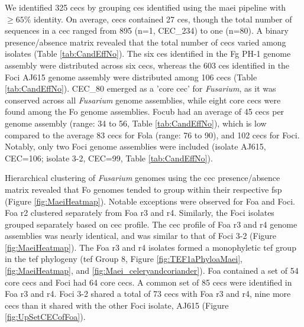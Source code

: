 We identified 325 \acfp{cec} by grouping \acp{ce} identified using the \ac{maei} pipeline with $\ge65\%$ identity. On average, \acp{cec} contained 27 \acp{ce}, though the total number of sequences in a \ac{cec} ranged from 895 (n=1, CEC\_234) to one (n=80). A binary presence/absence matrix revealed that the total number of \acp{cec} varied among isolates (Table \ref{tab:CandEffNo}). The six \acp{ce} identified in the \ac{Fg} PH-1 genome assembly were distributed across six \acp{cec}, whereas the 603 \acp{ce} identified in the \ac{Foci} AJ615 genome assembly were distributed among 106 \acp{cec} (Table \ref{tab:CandEffNo}). CEC\_80 emerged as a 'core \ac{cec}' for \textit{Fusarium}, as it was conserved across all \textit{Fusarium} genome assemblies, while eight core \acp{cec} were found among the \ac{Fo} genome assemblies. \ac{Focub} had an average of 45 \acp{cec} per genome assembly (range: 34 to 56, Table \ref{tab:CandEffNo}), which is low compared to the average 83 \acp{cec} for \ac{Fola} (range: 76 to 90), and 102 \acp{cec} for \ac{Foci}. Notably, only two \ac{Foci} genome assemblies were included (isolate AJ615, CEC=106; isolate 3-2, CEC=99, Table \ref{tab:CandEffNo}). 

Hierarchical clustering of \textit{Fusarium} genomes using the  \ac{cec} presence/absence matrix revealed that \ac{Fo} genomes tended to group within their respective \ac{fsp} (Figure \ref{fig:MaeiHeatmap}). Notable exceptions were observed for \ac{Foa} and \ac{Foci}. \ac{Foa} \ac{r2} clustered separately from \ac{Foa} \ac{r3} and \ac{r4}. Similarly, the \ac{Foci} isolates grouped separately based on \ac{cec} profile. The \ac{cec} profile of \ac{Foa} \ac{r3} and \ac{r4} genome assemblies was nearly identical, and was similar to that of \ac{Foci} 3-2 (Figure \ref{fig:MaeiHeatmap}). The \ac{Foa} \ac{r3} and \ac{r4} isolates formed a monophyletic \ac{tef} group in the \ac{tef} phylogeny (\ac{tef} Group 8, Figure \ref{fig:TEF1aPhyloaMaei}, \ref{fig:MaeiHeatmap}, and \ref{fig:Maei_celeryandcoriander}). \ac{Foa} contained a set of 54 core \acp{cec} and \ac{Foci} had 64 core \acp{cec}. A common set of 85 \acp{cec} were identified in \ac{Foa} \ac{r3} and \ac{r4}. \ac{Foci} 3-2 shared a total of 73 \acp{cec} with \ac{Foa} \ac{r3} and \ac{r4}, nine more \acp{cec} than it shared with the other \ac{Foci} isolate, AJ615 (Figure \ref{fig:UpSetCECofFoa}). 

